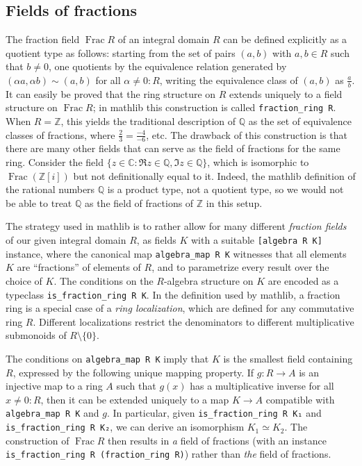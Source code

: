 \documentclass[sn-mathphys]{sn-jnl}%
\renewcommand{\C}{\mathbb{C}}
\newcommand{\lean}[1]{\texttt{#1}\xspace}
\newcommand{\mathlib}{\textsf{mathlib}\xspace}
\newcommand{\QQ}{\mathbb{Q}}
\renewcommand{\Z}{\mathbb{Z}}
\DeclareMathOperator{\Frac}{Frac}
\begin{document}
\subsection{Fields of fractions}\label{subsection : fields of fractions}
The fraction field $\Frac R$ of an integral domain $R$ can be defined explicitly as a quotient type as follows:
starting from the set of pairs $(a,b)$ with $a,b \in R$ such that $b\neq 0$,
one quotients by the equivalence relation generated by $(\alpha a, \alpha b) \sim (a,b)$ for all $\alpha \ne 0 : R$, writing the equivalence class of $(a,b)$ as $\frac{a}{b}$.
It can easily be proved that the ring structure on $R$ extends uniquely to a field structure on $\Frac R$;
in \mathlib this construction is called \mbox{\lean{fraction\_ring R}}.
When $R=\Z$, this yields the traditional description of $\QQ$ as the set of equivalence classes of fractions, where $\frac{2}{3}=\frac{-4}{-6}$, etc.
The drawback of this construction is that there are many other fields that can serve as the field of fractions for the same ring.
Consider the field $\{z \in \C : \Re z \in \QQ, \Im z\in\QQ\}$, which is isomorphic to $\Frac (\Z[i])$ but not definitionally equal to it.
Indeed, the \mathlib definition of the rational numbers $\QQ$ is a product type, not a quotient type, so we would not be able to treat $\QQ$ as the field of fractions of $\Z$ in this setup.

The strategy used in \mathlib is to rather allow for many different \emph{fraction fields} of our given integral domain $R$,
as fields $K$ with a suitable \lean{[algebra R K]} instance, where the canonical map \lean{algebra\_map R K} witnesses that all elements $K$ are ``fractions'' of elements of $R$,
and to parametrize every result over the choice of $K$.
The conditions on the $R$-algebra structure on $K$ are encoded as a typeclass \lean{is\_fraction\_ring R K}.
In the definition used by \mathlib, a fraction ring is a special case of a \emph{ring localization},
which are defined for any commutative ring $R$.
Different localizations restrict the denominators to different multiplicative submonoids of $R\setminus\{0\}$.

The conditions on \lean{algebra\_map R K} imply that $K$ is the smallest field containing $R$, expressed by the following unique mapping property.
If $g \colon R \to A$ is an injective map to a ring $A$ such that $g(x)$ has a multiplicative inverse for all $x \ne 0 : R$, then
it can be extended uniquely to a map $K \to A$ compatible with \lean{algebra\_map R K} and $g$.
In particular, given \lean{is\_fraction\_ring R K₁} and \lean{is\_fraction\_ring R K₂}, we can derive an isomorphism $K_1 \simeq K_2$.
The construction of $\Frac R$ then results in \emph{a} field of fractions (with an instance \lean{is\_fraction\_ring R (fraction\_ring R)}) rather than \emph{the} field of fractions.
\end{document}

